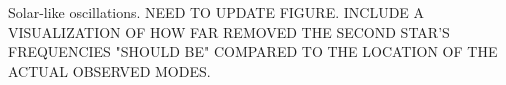 \label{fig:seismo} Solar-like oscillations. NEED TO UPDATE FIGURE. INCLUDE A VISUALIZATION OF HOW FAR REMOVED THE SECOND STAR'S FREQUENCIES "SHOULD BE" COMPARED TO THE LOCATION OF THE ACTUAL OBSERVED MODES.
    